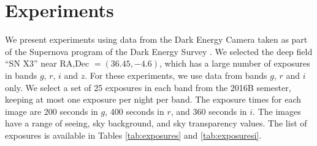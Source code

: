 \documentclass[11pt,letterpaper,linenumbers]{aastex63}
\begin{document}
\section{Experiments}



We present experiments using data from the Dark Energy Camera
\citep{decam} taken as part of the Supernova program \citep{dessn} of
the Dark Energy Survey \citep{des}.  We selected the deep field ``SN
X3'' near RA,Dec $= (36.45, -4.6)$, which has a large number of
exposures in bands $g$, $r$, $i$ and $z$.  For these experiments, we
use data from bands $g$, $r$ and $i$ only.  We select a set of 25
exposures in each band from the 2016B semester, keeping at most one
exposure per night per band.  The exposure times for each image are
200 seconds in $g$, 400 seconds in $r$, and 360 seconds in $i$.  The
images have a range of seeing, sky background, and sky transparency
values.  The list of exposures is available in Tables
\ref{tab:exposures} and \ref{tab:exposuresi}.
\end{document}
